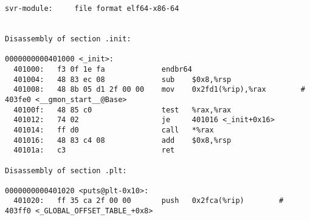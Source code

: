 \documentclass{article}
\begin{document}
  \scriptsize
  \makeatletter 
  \makeatother
  \begin{verbatim}
svr-module:     file format elf64-x86-64


Disassembly of section .init:

0000000000401000 <_init>:
  401000:	f3 0f 1e fa          	endbr64
  401004:	48 83 ec 08          	sub    $0x8,%rsp
  401008:	48 8b 05 d1 2f 00 00 	mov    0x2fd1(%rip),%rax        # 403fe0 <__gmon_start__@Base>
  40100f:	48 85 c0             	test   %rax,%rax
  401012:	74 02                	je     401016 <_init+0x16>
  401014:	ff d0                	call   *%rax
  401016:	48 83 c4 08          	add    $0x8,%rsp
  40101a:	c3                   	ret

Disassembly of section .plt:

0000000000401020 <puts@plt-0x10>:
  401020:	ff 35 ca 2f 00 00    	push   0x2fca(%rip)        # 403ff0 <_GLOBAL_OFFSET_TABLE_+0x8>
  \end{verbatim} 
\end{document}
